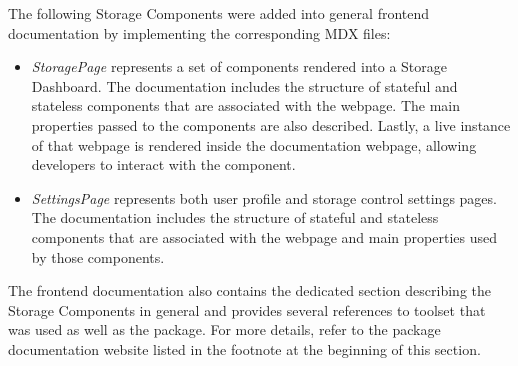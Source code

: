 The following Storage Components were added into general frontend documentation by implementing the corresponding MDX files:
\begin{itemize}
    \item \textit{StoragePage} represents a set of components rendered into a Storage Dashboard. The documentation includes the structure of stateful and stateless components that are associated with the webpage. The main properties passed to the components are also described. Lastly, a live instance of that webpage is rendered inside the documentation webpage, allowing developers to interact with the component.
    \item \textit{SettingsPage} represents both user profile and storage control settings pages. The documentation includes the structure of stateful and stateless components that are associated with the webpage and main properties used by those components. 
\end{itemize}

The frontend documentation also contains the dedicated section describing the Storage Components in general and provides several references to \solid{} toolset that was used as well as the \lpas{} package. For more details, refer to the package documentation website listed in the footnote at the beginning of this section.
